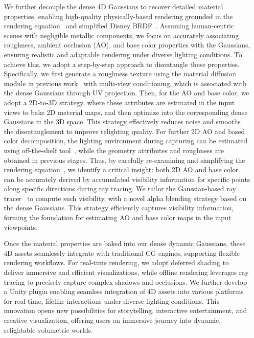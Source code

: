 We further decouple the dense 4D Gaussians to recover detailed material properties, enabling high-quality physically-based rendering grounded in the rendering equation~\cite{kajiya1986rendering} and simplified Disney BRDF~\cite{burley2012physically}.
Assuming human-centric scenes with negligible metallic components, we focus on accurately associating roughness, ambient occlusion (AO), and base color properties with the Gaussians, ensuring realistic and adaptable rendering under diverse lighting conditions.
To achieve this, we adopt a step-by-step approach to disentangle these properties.  
Specifically, we first generate a roughness texture using the material diffusion module in previous work~\cite{zhang2024clay} with multi-view conditioning, which is associated with the dense Gaussians through UV projection. Then, for the AO and base color, we adopt a 2D-to-3D strategy, where these attributes are estimated in the input views to bake 2D material maps, and then optimize into the corresponding dense Gaussians in the 3D space. This strategy effectively reduces noise and smooths the disentanglement to improve relighting quality. For further 2D AO and based color decomposition, the lighting environment during capturing can be estimated using off-the-shelf tool~\cite{new_house_internet_services_bv_ptgui_2025}, while the geometry attributes and roughness are obtained in previous stages. Thus, by carefully re-examining and simplifying the rendering equation~\cite{kajiya1986rendering}, we identify a critical insight: both 2D AO and base color can be accurately derived by accumulated visibility information for specific points along specific directions during ray tracing. We tailor the Gaussian-based ray tracer~\cite{3dgrt2024} to compute such visibility, with a novel alpha blending strategy based on the dense Gaussians. This strategy efficiently captures visibility information, forming the foundation for estimating AO and base color maps in the input viewpoints.

Once the material properties are baked into our dense dynamic Gaussians, these 4D assets seamlessly integrate with traditional CG engines, supporting flexible rendering workflows. For real-time rendering, we adopt deferred shading to deliver immersive and efficient visualizations, while offline rendering leverages ray tracing to precisely capture complex shadows and occlusions.
We further develop a Unity plugin enabling seamless integration of 4D assets into various platforms for real-time, lifelike interactions under diverse lighting conditions. This innovation opens new possibilities for storytelling, interactive entertainment, and creative visualization, offering users an immersive journey into dynamic, relightable volumetric worlds.













